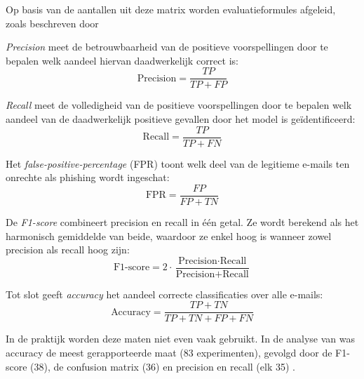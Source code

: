 Op basis van de aantallen uit deze matrix worden evaluatieformules afgeleid, zoals beschreven door \textcite{Sokolova2009}

\emph{Precision} meet de betrouwbaarheid van de positieve voorspellingen door te bepalen welk aandeel hiervan daadwerkelijk correct is:
\begin{equation*}
    \text{Precision} = \frac{TP}{TP + FP}
\end{equation*}

\emph{Recall} meet de volledigheid van de positieve voorspellingen door te bepalen welk aandeel van de daadwerkelijk positieve gevallen door het model is geïdentificeerd:
\begin{equation*}
    \text{Recall} = \frac{TP}{TP + FN}
\end{equation*}

Het \emph{false-positive-percentage} (FPR) toont welk deel van de legitieme e-mails ten onrechte als phishing wordt ingeschat:
\begin{equation*}
    \text{FPR} = \frac{FP}{FP + TN}
\end{equation*}

De \emph{F1-score} combineert precision en recall in één getal. Ze wordt berekend als het harmonisch gemiddelde van beide, waardoor ze enkel hoog is wanneer zowel precision als recall hoog zijn:
\begin{equation*}
    \text{F1-score} = 2 \cdot \frac{\text{Precision} \cdot \text{Recall}}{\text{Precision} + \text{Recall}}
\end{equation*}

Tot slot geeft \emph{accuracy} het aandeel correcte classificaties over alle e-mails:
\begin{equation*}
    \text{Accuracy} = \frac{TP + TN}{TP + TN + FP + FN}
\end{equation*}

In de praktijk worden deze maten niet even vaak gebruikt. In de analyse van \textcite{Salloum2022} was accuracy de meest gerapporteerde maat (83 experimenten), gevolgd door de F1-score (38), de confusion matrix (36) en precision en recall (elk 35) \autocite{Salloum2022}.
